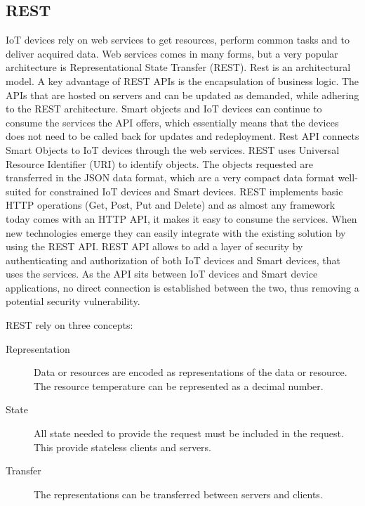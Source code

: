 \subsection{REST}
IoT devices rely on web services to get resources, perform common tasks and to deliver acquired data. Web services comes in many forms, but a very popular architecture is Representational State Transfer (REST). Rest is an architectural model. A key advantage of REST APIs is the encapsulation of business logic. The APIs that are hosted on servers and can be updated as demanded, while adhering to the REST architecture. Smart objects and IoT devices can continue to consume the services the API offers, which essentially means that the devices does not need to be called back for updates and redeployment. Rest API connects Smart Objects to IoT devices through the web services. REST uses  Universal Resource Identifier (URI) to identify objects. The objects requested are transferred in the JSON data format, which are a very compact data format well-suited for constrained IoT devices and Smart devices. REST implements basic HTTP operations (Get, Post, Put and Delete) and as almost any framework today comes with an HTTP API, it makes it easy to consume the services. When new technologies emerge they can easily integrate with the existing solution by using the REST API. REST API allows to add a layer of security by authenticating and authorization of both IoT devices and Smart devices, that uses the services. As the API sits between IoT devices and Smart device applications, no direct connection is established between the two, thus removing a potential security vulnerability. 

REST rely on three concepts: 
\begin{description}
    \item[Representation] Data or resources are encoded as representations of the data or resource. The resource temperature can be represented as a decimal number.
    \item[State] All state needed to provide the request must be included in the request. This provide stateless clients and servers. 
    \item[Transfer] The representations can be transferred between servers and clients.
    \cite{smartthings} 
\end{description} 

